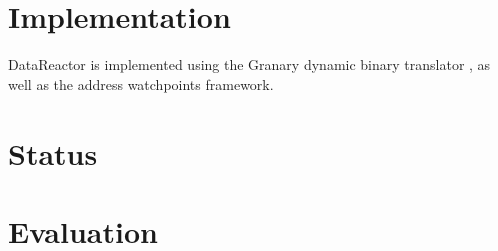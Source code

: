 \documentclass{sig-alternate}
\newcommand{\Toolname}{DataReactor}
\begin{document}
%
%
%
%


\section{Implementation}\label{sec:implementation}
\Toolname{} is implemented using the Granary dynamic binary translator \cite{Granary}, as well as the address watchpoints
\cite{AddressWatchpoints} framework.


\section{Status}\label{sec:status}


\section{Evaluation}\label{sec:evaluation}




\end{document}
